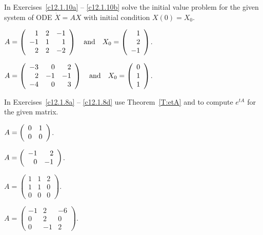 \documentclass{ximera}
\begin{document}
\noindent  In Exercises~\ref{c12.1.10a} -- \ref{c12.1.10b}  solve the 
initial value problem for the given system of ODE $\dot{X}=AX$ with 
initial condition $X(0)=X_0$.
\begin{exercise}  \label{c12.1.10a}
$A=\left(\begin{array}{rrr} 
     1   &  2  &  -1 \\
    -1   &  1  &   1 \\
     2   &  2  &  -2
\end{array}\right) \quad\mbox{and}\quad 
X_0=\left(\begin{array}{r} 1 \\ 2 \\ -1  \end{array}\right)$.
\end{exercise}
\begin{exercise}  \label{c12.1.10b}
$A=\left(\begin{array}{rrr}
    -3   &  0   &  2\\
     2   & -1   & -1\\
    -4   &  0   &  3
\end{array}\right) \quad\mbox{and}\quad 
X_0=\left(\begin{array}{r} 0 \\ 1 \\ 1  \end{array}\right)$.
\end{exercise}

\noindent  In Exercises~\ref{c12.1.8a} -- \ref{c12.1.8d} use
Theorem~\ref{T:etA} and \Matlab to compute $e^{tA}$ for the given matrix.
\begin{exercise} \label{c12.1.8a}
$A = \left(\begin{array}{rr} 0 & 1\\ 0 &0\end{array}\right)$.
\end{exercise}
\begin{exercise} \label{c12.1.8b}
$A = \left(\begin{array}{rr} -1 & 2\\ 0 &-1\end{array}\right)$.
\end{exercise}
\begin{exercise} \label{c12.1.8c}
$A = \left(\begin{array}{rrr} 1 & 1 & 2\\ 1 & 1 & 0 \\ 0 & 0 & 0
\end{array}\right)$.
\end{exercise}
\begin{exercise} \label{c12.1.8d}
$A = \left(\begin{array}{rrr} -1 & 2 & -6\\ 0 & 2 & 0 \\ 0 & -1 & 2
\end{array}\right)$.
\end{exercise} 
\end{document}
